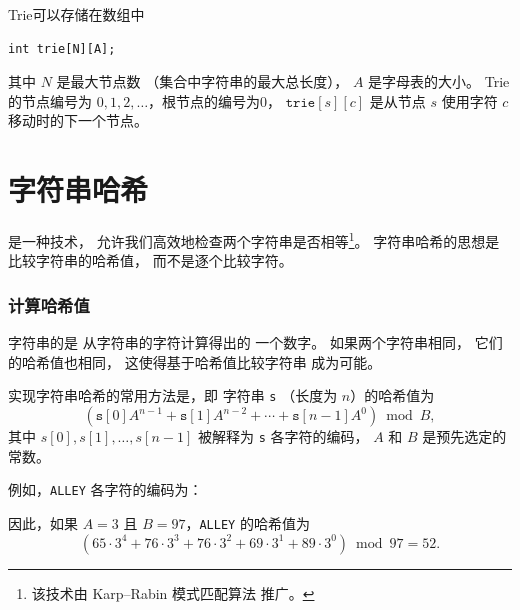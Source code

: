 Trie可以存储在数组中
\begin{lstlisting}
int trie[N][A];
\end{lstlisting}
其中 $N$ 是最大节点数
（集合中字符串的最大总长度），
$A$ 是字母表的大小。
Trie的节点编号为
$0,1,2,\ldots$，根节点的编号为0，
$\texttt{trie}[s][c]$ 是从节点 $s$ 使用字符 $c$
移动时的下一个节点。

\section{字符串哈希}


是一种技术，
允许我们高效地检查两个字符串是否相等\footnote{该技术由 Karp–Rabin 模式匹配算法 \cite{kar87} 推广。}。
字符串哈希的思想是比较字符串的哈希值，
而不是逐个比较字符。

\subsubsection*{计算哈希值}


字符串的是
从字符串的字符计算得出的
一个数字。
如果两个字符串相同，
它们的哈希值也相同，
这使得基于哈希值比较字符串
成为可能。

实现字符串哈希的常用方法是，即
字符串 \texttt{s} （长度为 $n$）的哈希值为
\[(\texttt{s}[0] A^{n-1} + \texttt{s}[1] A^{n-2} + \cdots + \texttt{s}[n-1] A^0) \bmod B  ,\]
其中 $s[0],s[1],\ldots,s[n-1]$
被解释为 \texttt{s} 各字符的编码，
$A$ 和 $B$ 是预先选定的常数。

例如，\texttt{ALLEY} 各字符的编码为：
\begin{center}
\end{center}

因此，如果 $A=3$ 且 $B=97$，\texttt{ALLEY} 的哈希值为
\[(65 \cdot 3^4 + 76 \cdot 3^3 + 76 \cdot 3^2 + 69 \cdot 3^1 + 89 \cdot 3^0) \bmod 97 = 52.\]

